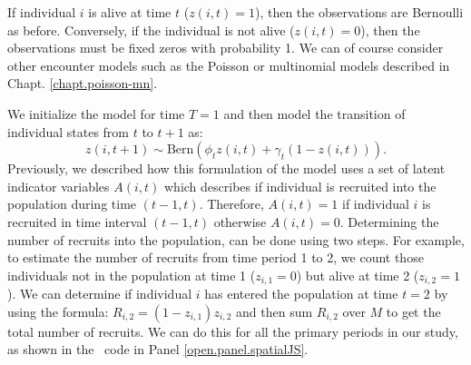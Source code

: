 If individual $i$ is alive at time $t$ ($z(i,t)=1$), then the
observations are Bernoulli as before.  Conversely, if the individual is
not alive ($z(i,t)=0$), then the observations must be fixed zeros with
probability 1.  We can of course consider other encounter models such as the
Poisson or multinomial models described 
in Chapt. \ref{chapt.poisson-mn}.

We initialize the
model for time $T=1$
and then model the transition of individual states from
$t$ to $t+1$ as: 
\[
 z(i,t+1) \sim \mbox{Bern}( \phi_t z(i,t)  + \gamma_t (1-z(i,t)) ).
\]
Previously, we described how this formulation of the model uses a set of latent indicator
variables $A(i,t)$ which describes if individual is recruited into the population during time
$(t-1, t)$.  Therefore, $A(i,t) = 1$
if individual $i$ is recruited in time interval $(t-1, t)$ otherwise
$A(i,t)=0$. 
Determining the number of recruits into the population,
can be done using two steps.
For example, to estimate the number of recruits from time period 1 to 2, we count those
individuals not in the population at time 1 ($z_{i,1} = 0$) but alive at time 2 ($z_{i,2} = 1$).
We can determine if individual $i$ has entered the population at time $t=2$ by using the formula:
 $R_{i,2}=(1-z_{i,1})z_{i,2}$ and then sum
$R_{i,2}$ over $M$ to get the total number of recruits.
We can do this for all the primary periods in our study,
as shown
in the \jags~code in Panel \ref{open.panel.spatialJS}.


